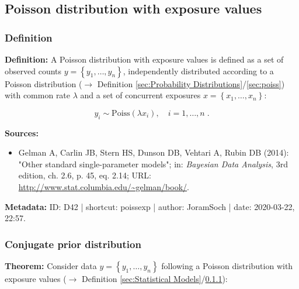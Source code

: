 \documentclass[a4paper,12pt,twoside]{book}
\begin{document}
\subsection{Poisson distribution with exposure values}

\subsubsection[\textit{Definition}]{Definition} \label{sec:poissexp}
\setcounter{equation}{0}

\textbf{Definition:} A Poisson distribution with exposure values is defined as a set of observed counts $y = \left\lbrace y_1, \ldots, y_n \right\rbrace$, independently distributed according to a Poisson distribution ($\rightarrow$ Definition \ref{sec:Probability Distributions}/\ref{sec:poiss}) with common rate $\lambda$ and a set of concurrent exposures $x = \left\lbrace x_1, \ldots, x_n \right\rbrace$:

\begin{equation} \label{eq:poissexp-Poiss-exp}
y_i \sim \mathrm{Poiss}(\lambda x_i), \quad i = 1, \ldots, n \; .
\end{equation}


\vspace{1em}
\textbf{Sources:}
\begin{itemize}
\item Gelman A, Carlin JB, Stern HS, Dunson DB, Vehtari A, Rubin DB (2014): "Other standard single-parameter models"; in: \textit{Bayesian Data Analysis}, 3rd edition, ch. 2.6, p. 45, eq. 2.14; URL: \url{http://www.stat.columbia.edu/~gelman/book/}.
\end{itemize}


\vspace{1em}
\textbf{Metadata:} ID: D42 | shortcut: poissexp | author: JoramSoch | date: 2020-03-22, 22:57.
\vspace{1em}



\subsubsection[\textbf{Conjugate prior distribution}]{Conjugate prior distribution} \label{sec:poissexp-prior}
\setcounter{equation}{0}

\textbf{Theorem:} Consider data $y = \left\lbrace y_1, \ldots, y_n \right\rbrace$ following a Poisson distribution with exposure values ($\rightarrow$ Definition \ref{sec:Statistical Models}/\ref{sec:poissexp}):
\end{document}
